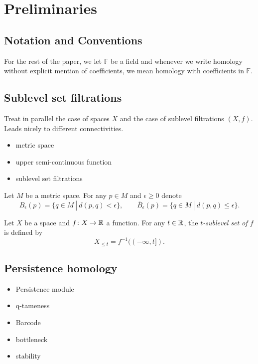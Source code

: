 
\section{Preliminaries}

\subsection*{Notation and Conventions}
For the rest of the paper, we let $\mathbb{F}$ be a field and whenever we write homology without explicit mention of coefficients, we mean homology with coefficients in $\mathbb{F}$.

\subsection{Sublevel set filtrations}

Treat in parallel the case of spaces $X$ and the case of sublevel filtrations $(X, f)$. Leads nicely to different connectivities.
\begin{itemize}
	\item metric space
	\item upper semi-continuous function
	\item sublevel set filtrations
\end{itemize}

\begin{defi}
	Let $M$ be a metric space. For any $p \in M$ and $\epsilon \geq 0$ denote
	\begin{equation*}
	B_\epsilon(p) = \{q \in M\ |\ d(p,q) < \epsilon\}, \qquad
	\overline B_\epsilon(p) = \{q \in M\ |\ d(p,q) \leq \epsilon\}.
	\end{equation*}
\end{defi}

\begin{defi}
	Let $X$ be a space and $f \colon X \to \mathbb{R}$ a function. For any $t \in \mathbb{R}$, the \textit{$t$-sublevel set of $f$} is defined by 
	\begin{equation*}
	X_{\leq t} = f^{-1}((-\infty, t]).
	\end{equation*}
\end{defi}

\subsection{Persistence homology}

\begin{itemize}
	\item Persistence module
	\item q-tameness
	\item Barcode
	\item bottleneck
	\item stability
\end{itemize}